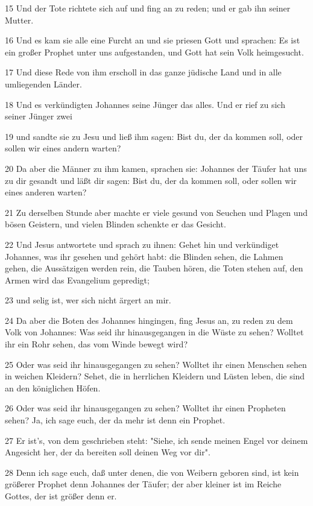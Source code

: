 \par 15 Und der Tote richtete sich auf und fing an zu reden; und er gab ihn seiner Mutter.
\par 16 Und es kam sie alle eine Furcht an und sie priesen Gott und sprachen: Es ist ein großer Prophet unter uns aufgestanden, und Gott hat sein Volk heimgesucht.
\par 17 Und diese Rede von ihm erscholl in das ganze jüdische Land und in alle umliegenden Länder.
\par 18 Und es verkündigten Johannes seine Jünger das alles. Und er rief zu sich seiner Jünger zwei
\par 19 und sandte sie zu Jesu und ließ ihm sagen: Bist du, der da kommen soll, oder sollen wir eines andern warten?
\par 20 Da aber die Männer zu ihm kamen, sprachen sie: Johannes der Täufer hat uns zu dir gesandt und läßt dir sagen: Bist du, der da kommen soll, oder sollen wir eines anderen warten?
\par 21 Zu derselben Stunde aber machte er viele gesund von Seuchen und Plagen und bösen Geistern, und vielen Blinden schenkte er das Gesicht.
\par 22 Und Jesus antwortete und sprach zu ihnen: Gehet hin und verkündiget Johannes, was ihr gesehen und gehört habt: die Blinden sehen, die Lahmen gehen, die Aussätzigen werden rein, die Tauben hören, die Toten stehen auf, den Armen wird das Evangelium gepredigt;
\par 23 und selig ist, wer sich nicht ärgert an mir.
\par 24 Da aber die Boten des Johannes hingingen, fing Jesus an, zu reden zu dem Volk von Johannes: Was seid ihr hinausgegangen in die Wüste zu sehen? Wolltet ihr ein Rohr sehen, das vom Winde bewegt wird?
\par 25 Oder was seid ihr hinausgegangen zu sehen? Wolltet ihr einen Menschen sehen in weichen Kleidern? Sehet, die in herrlichen Kleidern und Lüsten leben, die sind an den königlichen Höfen.
\par 26 Oder was seid ihr hinausgegangen zu sehen? Wolltet ihr einen Propheten sehen? Ja, ich sage euch, der da mehr ist denn ein Prophet.
\par 27 Er ist's, von dem geschrieben steht: "Siehe, ich sende meinen Engel vor deinem Angesicht her, der da bereiten soll deinen Weg vor dir".
\par 28 Denn ich sage euch, daß unter denen, die von Weibern geboren sind, ist kein größerer Prophet denn Johannes der Täufer; der aber kleiner ist im Reiche Gottes, der ist größer denn er.
